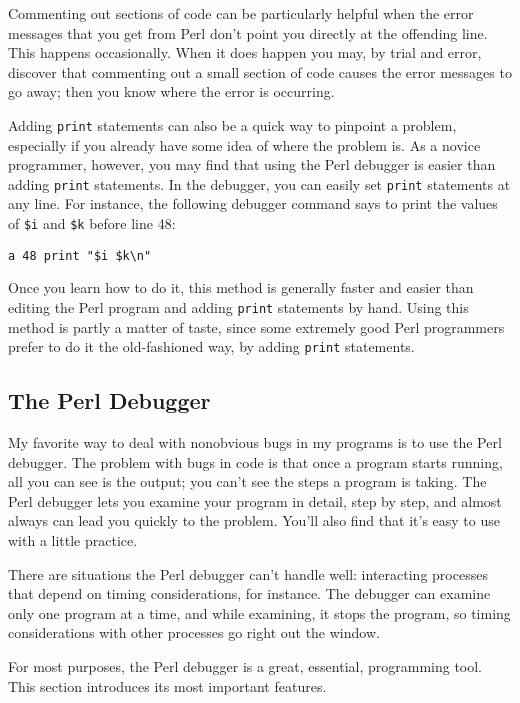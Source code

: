 Commenting out sections of code can be particularly helpful when the error messages that you get from Perl don't point you directly at the offending line. This happens occasionally. When it does happen you may, by trial and error, discover that commenting out a small section of code causes the error messages to go away; then you know where the error is occurring.

Adding \verb|print| statements can also be a quick way to pinpoint a problem, especially if you already have some idea of where the problem is. As a novice programmer, however, you may find that using the Perl debugger is easier than adding \verb|print| statements. In the debugger, you can easily set \verb|print| statements at any line. For instance, the following debugger command says to print the values of \verb|$i| and \verb|$k| before line 48:

\begin{lstlisting}
a 48 print "$i $k\n"
\end{lstlisting}

Once you learn how to do it, this method is generally faster and easier than editing the Perl program and adding \verb|print| statements by hand. Using this method is partly a matter of taste, since some extremely good Perl programmers prefer to do it the old-fashioned way, by adding \verb|print| statements. 

\subsection{The Perl Debugger}
My favorite way to deal with nonobvious bugs in my programs is to use the Perl debugger. The problem with bugs in code is that once a program starts running, all you can see is the output; you can't see the steps a program is taking. The Perl debugger lets you examine your program in detail, step by step, and almost always can lead you quickly to the problem. You'll also find that it's easy to use with a little practice.

There are situations the Perl debugger can't handle well: interacting processes that depend on timing considerations, for instance. The debugger can examine only one program at a time, and while examining, it stops the program, so timing considerations with other processes go right out the window.

For most purposes, the Perl debugger is a great, essential, programming tool. This section introduces its most important features. 

